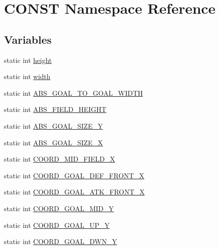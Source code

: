 \hypertarget{namespace_c_o_n_s_t}{}\section{C\+O\+N\+ST Namespace Reference}
\label{namespace_c_o_n_s_t}
\subsection*{Variables}
\begin{DoxyCompactItemize}
\item 
static int \hyperlink{namespace_c_o_n_s_t_a9805ca9eb67b8225c60697567283175d}{height}
\item 
static int \hyperlink{namespace_c_o_n_s_t_afd10469262c8cf9aec66ca799bfea24c}{width}
\item 
static int \hyperlink{namespace_c_o_n_s_t_abe3ca2e589a94f9e273309abaa8313d4}{A\+B\+S\+\_\+\+G\+O\+A\+L\+\_\+\+T\+O\+\_\+\+G\+O\+A\+L\+\_\+\+W\+I\+D\+TH}
\item 
static int \hyperlink{namespace_c_o_n_s_t_a42a76a781b7cd424616b37ec9d720f98}{A\+B\+S\+\_\+\+F\+I\+E\+L\+D\+\_\+\+H\+E\+I\+G\+HT}
\item 
static int \hyperlink{namespace_c_o_n_s_t_a5461381c3d71d5f77ef87d4e8c2b05df}{A\+B\+S\+\_\+\+G\+O\+A\+L\+\_\+\+S\+I\+Z\+E\+\_\+Y}
\item 
static int \hyperlink{namespace_c_o_n_s_t_a01f9b9486ce728d46c65c5d2fc2798d4}{A\+B\+S\+\_\+\+G\+O\+A\+L\+\_\+\+S\+I\+Z\+E\+\_\+X}
\item 
static int \hyperlink{namespace_c_o_n_s_t_ad21da2e838c0a8da29db74cba008cf46}{C\+O\+O\+R\+D\+\_\+\+M\+I\+D\+\_\+\+F\+I\+E\+L\+D\+\_\+X}
\item 
static int \hyperlink{namespace_c_o_n_s_t_a0337e257371474864833c9d72e5295e4}{C\+O\+O\+R\+D\+\_\+\+G\+O\+A\+L\+\_\+\+D\+E\+F\+\_\+\+F\+R\+O\+N\+T\+\_\+X}
\item 
static int \hyperlink{namespace_c_o_n_s_t_a8788c5d888fd3e9d9382502aee24afee}{C\+O\+O\+R\+D\+\_\+\+G\+O\+A\+L\+\_\+\+A\+T\+K\+\_\+\+F\+R\+O\+N\+T\+\_\+X}
\item 
static int \hyperlink{namespace_c_o_n_s_t_a227a51bc8809f1391dc096eafb6b1d85}{C\+O\+O\+R\+D\+\_\+\+G\+O\+A\+L\+\_\+\+M\+I\+D\+\_\+Y}
\item 
static int \hyperlink{namespace_c_o_n_s_t_ab1e77f62ff88d04c9aac407f4405add2}{C\+O\+O\+R\+D\+\_\+\+G\+O\+A\+L\+\_\+\+U\+P\+\_\+Y}
\item 
static int \hyperlink{namespace_c_o_n_s_t_a97382a534273f1ca10b7cdf29fab9d0a}{C\+O\+O\+R\+D\+\_\+\+G\+O\+A\+L\+\_\+\+D\+W\+N\+\_\+Y}

\end{DoxyCompactItemize}

